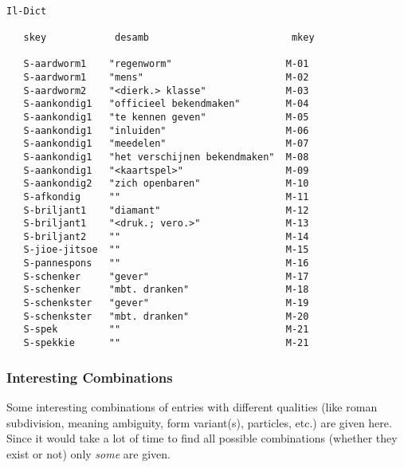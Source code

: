 \begin{verbatim}
 
Il-Dict
    
   skey            desamb                         mkey
    
   S-aardworm1    "regenworm"                    M-01
   S-aardworm1    "mens"                         M-02
   S-aardworm2    "<dierk.> klasse"              M-03
   S-aankondig1   "officieel bekendmaken"        M-04
   S-aankondig1   "te kennen geven"              M-05
   S-aankondig1   "inluiden"                     M-06
   S-aankondig1   "meedelen"                     M-07
   S-aankondig1   "het verschijnen bekendmaken"  M-08
   S-aankondig1   "<kaartspel>"                  M-09
   S-aankondig2   "zich openbaren"               M-10
   S-afkondig     ""                             M-11
   S-briljant1    "diamant"                      M-12
   S-briljant1    "<druk.; vero.>"               M-13
   S-briljant2    ""                             M-14
   S-jioe-jitsoe  ""                             M-15
   S-pannespons   ""                             M-16
   S-schenker     "gever"                        M-17
   S-schenker     "mbt. dranken"                 M-18
   S-schenkster   "gever"                        M-19
   S-schenkster   "mbt. dranken"                 M-20
   S-spek         ""                             M-21
   S-spekkie      ""                             M-21
\end{verbatim}
 
\subsubsection{Interesting Combinations}
 
Some interesting combinations of entries with different qualities (like
roman subdivision, meaning ambiguity, form variant(s), particles, etc.)
are given here. Since it would take a lot of time to find all possible 
combinations (whether they exist or not) only {\em some} are given.
 
